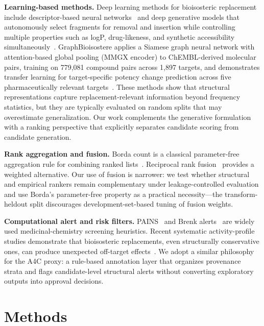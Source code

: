 \documentclass[12pt,letterpaper]{article}
\begin{document}
\textbf{Learning-based methods.}
Deep learning methods for bioisosteric replacement include descriptor-based neural networks~\cite{ertl2020identification} and deep generative models that autonomously select fragments for removal and insertion while controlling multiple properties such as logP, drug-likeness, and synthetic accessibility simultaneously~\cite{kim2025deepbioisostere}. GraphBioisostere applies a Siamese graph neural network with attention-based global pooling (MMGX encoder) to ChEMBL-derived molecular pairs, training on 779,081 compound pairs across 1,897 targets, and demonstrates transfer learning for target-specific potency change prediction across five pharmaceutically relevant targets~\cite{masunaga2026graphbioisostere}. These methods show that structural representations capture replacement-relevant information beyond frequency statistics, but they are typically evaluated on random splits that may overestimate generalization. Our work complements the generative formulation with a ranking perspective that explicitly separates candidate scoring from candidate generation.

\textbf{Rank aggregation and fusion.}
Borda count is a classical parameter-free aggregation rule for combining ranked lists~\cite{dwork2001rank}. Reciprocal rank fusion~\cite{cormack2009reciprocal} provides a weighted alternative. Our use of fusion is narrower: we test whether structural and empirical rankers remain complementary under leakage-controlled evaluation and use Borda's parameter-free property as a practical necessity---the transform-heldout split discourages development-set-based tuning of fusion weights.

\textbf{Computational alert and risk filters.}
PAINS~\cite{baell2010new} and Brenk alerts~\cite{brenk2008lessons} are widely used medicinal-chemistry screening heuristics. Recent systematic activity-profile studies demonstrate that bioisosteric replacements, even structurally conservative ones, can produce unexpected off-target effects~\cite{helmke2025data}. We adopt a similar philosophy for the A4C proxy: a rule-based annotation layer that organizes provenance strata and flags candidate-level structural alerts without converting exploratory outputs into approval decisions.


\section{Methods}
\end{document}
